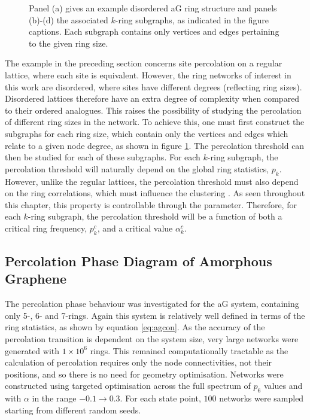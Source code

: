 \begin{figure}[bt]
     \caption{Panel (a) gives an example disordered aG ring structure and panels (b)\--(d) the associated $k$\--ring subgraphs, as indicated in the figure captions. Each subgraph contains only vertices and edges pertaining to the given ring size.}
     \label{fig:subgraphs}
\end{figure}

The example in the preceding section concerns site percolation on a regular lattice, where each site is equivalent.
However, the ring networks of interest in this work are disordered, where sites have different degrees (reflecting ring sizes).
Disordered lattices therefore have an extra degree of complexity when compared to their ordered analogues.
This raises the possibility of studying the percolation of different ring sizes in the network.
To achieve this, one must first construct the subgraphs for each ring size, which contain only the vertices and edges which relate to a given node degree, as shown  in figure \ref{fig:subgraphs}.
The percolation threshold can then be studied for each of these subgraphs.
For each $k$\--ring subgraph, the percolation threshold will naturally depend on the global ring statistics, $p_k$.
However, unlike the regular lattices, the percolation threshold must also depend on the ring correlations, which must influence the clustering \cite{Newman2003}.
As seen throughout this chapter, this property is controllable through the \aw{} parameter.
Therefore, for each $k$\--ring subgraph, the percolation threshold will be a function of both a critical ring frequency, $p_k^c$, and a critical \aw{} value $\alpha_k^c$.

\subsection{Percolation Phase Diagram of Amorphous Graphene}
\label{s:percphasediagram}

The percolation phase behaviour was investigated for the aG system, containing only 5\--, 6\-- and 7\--rings.
Again this system is relatively well defined in terms of the ring statistics, as shown by equation \ref{eq:agcon}.
As the accuracy of the percolation transition is dependent on the system size, very large networks were generated with $1\times10^6$ rings.
This remained computationally tractable as the calculation of percolation requires only the node connectivities, not their positions, and so there is no need for geometry optimisation.
Networks were constructed using targeted optimisation across the full spectrum of $p_6$ values and with $\alpha$ in the range $-0.1\rightarrow 0.3$.
For each state point, $100$ networks were sampled starting from different random seeds. 

